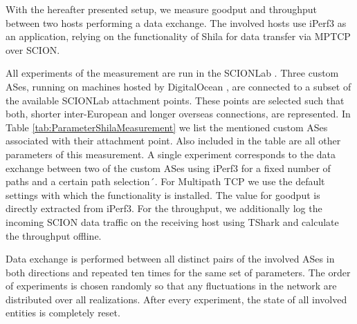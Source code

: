 With the hereafter presented setup, we measure goodput and throughput between two hosts performing a data exchange. The involved hosts use iPerf3 as an application, relying on the functionality of Shila for data transfer via MPTCP over SCION. 

All experiments of the measurement are run in the SCIONLab \cite{SCIOLab}. Three custom ASes, running on machines hosted by DigitalOcean \cite{DigitalOcean}, are connected to a subset of the available SCIONLab attachment points. These points are selected such that both, shorter inter-European and longer overseas connections, are represented. In Table \ref{tab:ParameterShilaMeasurement} we list the mentioned custom ASes associated with their attachment point. Also included in the table are all other parameters of this measurement. A single experiment corresponds to the data exchange between two of the custom ASes using iPerf3 for a fixed number of paths and a certain path selection´. For Multipath TCP we use the default settings with which the functionality is installed. The value for goodput is directly extracted from iPerf3. For the throughput, we additionally log the incoming SCION data traffic on the receiving host using TShark \cite{tshark} and calculate the throughput offline. 

Data exchange is performed between all distinct pairs of the involved ASes in both directions and repeated ten times for the same set of parameters. The order of experiments is chosen randomly so that any fluctuations in the network are distributed over all realizations. After every experiment, the state of all involved entities is completely reset.

